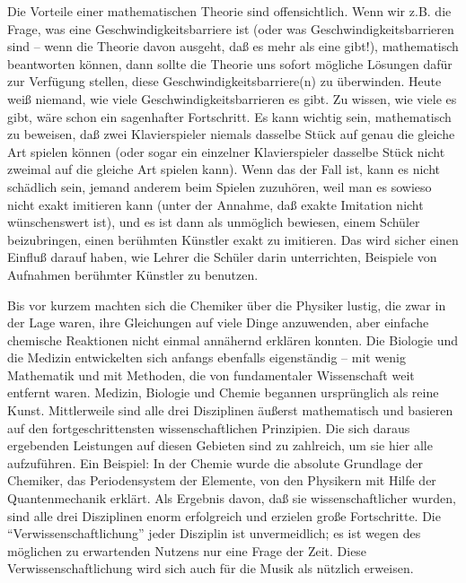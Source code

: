 Die Vorteile einer mathematischen Theorie sind offensichtlich.
Wenn wir z.B. die Frage, was eine Geschwindigkeitsbarriere ist (oder was Geschwindigkeitsbarrieren sind -- wenn die Theorie davon ausgeht, daß es mehr als eine gibt!), mathematisch beantworten können, dann sollte die Theorie uns sofort mögliche Lösungen dafür zur Verfügung stellen, diese Geschwindigkeitsbarriere(n) zu überwinden.
Heute weiß niemand, wie viele Geschwindigkeitsbarrieren es gibt.
Zu wissen, wie viele es gibt, wäre schon ein sagenhafter Fortschritt.
Es kann wichtig sein, mathematisch zu beweisen, daß zwei Klavierspieler niemals dasselbe Stück auf genau die gleiche Art spielen können (oder sogar ein einzelner Klavierspieler dasselbe Stück nicht zweimal auf die gleiche Art spielen kann).
Wenn das der Fall ist, kann es nicht schädlich sein, jemand anderem beim Spielen zuzuhören, weil man es sowieso nicht exakt imitieren kann (unter der Annahme, daß exakte Imitation nicht wünschenswert ist), und es ist dann als unmöglich bewiesen, einem Schüler beizubringen, einen berühmten Künstler exakt zu imitieren.
Das wird sicher einen Einfluß darauf haben, wie Lehrer die Schüler darin unterrichten, Beispiele von Aufnahmen berühmter Künstler zu benutzen.

Bis vor kurzem machten sich die Chemiker über die Physiker lustig, die zwar in der Lage waren, ihre Gleichungen auf viele Dinge anzuwenden, aber einfache chemische Reaktionen nicht einmal annähernd erklären konnten.
Die Biologie und die Medizin entwickelten sich anfangs ebenfalls eigenständig -- mit wenig Mathematik und mit Methoden, die von fundamentaler Wissenschaft weit entfernt waren.
Medizin, Biologie und Chemie begannen ursprünglich als reine Kunst.
Mittlerweile sind alle drei Disziplinen äußerst mathematisch und basieren auf den fortgeschrittensten wissenschaftlichen Prinzipien.
Die sich daraus ergebenden Leistungen auf diesen Gebieten sind zu zahlreich, um sie hier alle aufzuführen.
Ein Beispiel: In der Chemie wurde die absolute Grundlage der Chemiker, das Periodensystem der Elemente, von den Physikern mit Hilfe der Quantenmechanik erklärt.
Als Ergebnis davon, daß sie wissenschaftlicher wurden, sind alle drei Disziplinen enorm erfolgreich und erzielen große Fortschritte.
Die \enquote{Verwissenschaftlichung} jeder Disziplin ist unvermeidlich; es ist wegen des möglichen zu erwartenden Nutzens nur eine Frage der Zeit.
Diese Verwissenschaftlichung wird sich auch für die Musik als nützlich erweisen.

